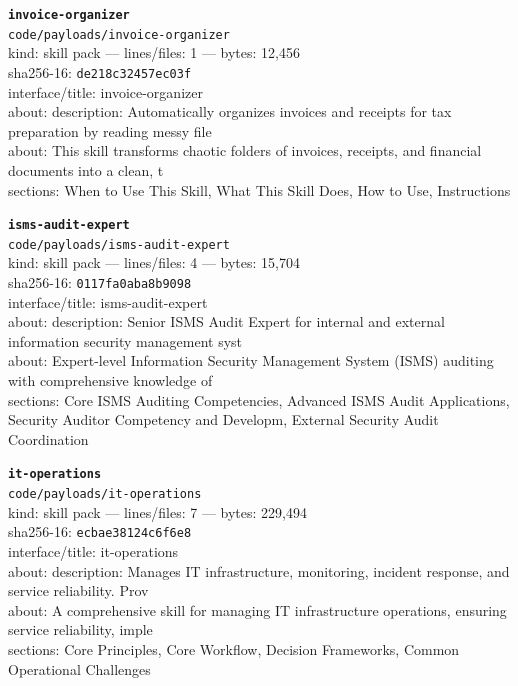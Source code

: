 \noindent\textbf{\texttt{invoice-organizer}}\\
\texttt{code/payloads/invoice-organizer}\\
kind: skill pack --- lines/files: 1 --- bytes: 12,456\\
sha256-16: \texttt{de218c32457ec03f}\\
interface/title: invoice-organizer\\
about: description: Automatically organizes invoices and receipts for tax preparation by reading messy file\\
about: This skill transforms chaotic folders of invoices, receipts, and financial documents into a clean, t\\
sections: When to Use This Skill, What This Skill Does, How to Use, Instructions\\
\vspace*{6.0pt}

\noindent\textbf{\texttt{isms-audit-expert}}\\
\texttt{code/payloads/isms-audit-expert}\\
kind: skill pack --- lines/files: 4 --- bytes: 15,704\\
sha256-16: \texttt{0117fa0aba8b9098}\\
interface/title: isms-audit-expert\\
about: description: Senior ISMS Audit Expert for internal and external information security management syst\\
about: Expert-level Information Security Management System (ISMS) auditing with comprehensive knowledge of \\
sections: Core ISMS Auditing Competencies, Advanced ISMS Audit Applications, Security Auditor Competency and Developm, External Security Audit Coordination\\
\vspace*{6.0pt}

\noindent\textbf{\texttt{it-operations}}\\
\texttt{code/payloads/it-operations}\\
kind: skill pack --- lines/files: 7 --- bytes: 229,494\\
sha256-16: \texttt{ecbae38124c6f6e8}\\
interface/title: it-operations\\
about: description: Manages IT infrastructure, monitoring, incident response, and service reliability. Prov\\
about: A comprehensive skill for managing IT infrastructure operations, ensuring service reliability, imple\\
sections: Core Principles, Core Workflow, Decision Frameworks, Common Operational Challenges\\
\vspace*{6.0pt}

